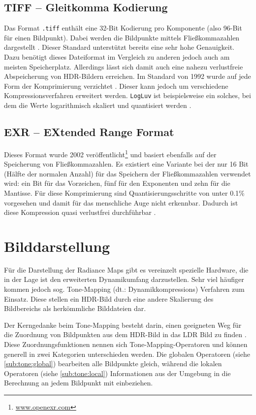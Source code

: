 \subsection{TIFF -- Gleitkomma Kodierung}
\label{sub:tiff}
Das Format \texttt{.tiff} enthält eine 32-Bit Kodierung pro Komponente (also 96-Bit für einen Bildpunkt). Dabei werden die Bildpunkte mittels Fließkommazahlen dargestellt \cite{adobe:tiff}. Dieser Standard unterstützt bereits eine sehr hohe Genauigkeit. Dazu benötigt dieses Dateiformat im Vergleich zu anderen jedoch auch am meisten Speicherplatz. Allerdings lässt sich damit auch eine nahezu verlustfreie Abspeicherung von \gls{HDR}-Bildern erreichen. Im Standard von 1992 wurde auf jede Form der Komprimierung verzichtet \cite[S. 93]{Reinhard}. Dieser kann jedoch um verschiedene Kompressionsverfahren erweitert werden. \texttt{LogLuv} ist beispielsweise ein solches, bei dem die Werte logarithmisch skaliert und quantisiert werden \cite{logluv}. 


\subsection{EXR -- EXtended Range Format}

Dieses Format wurde 2002 veröffentlicht\footnote{\url{www.openexr.com}} und basiert ebenfalls auf der Speicherung von Fließkommazahlen. Es existiert eine Variante bei der nur 16 Bit (Hälfte der normalen Anzahl) für das Speichern der Fließkommazahlen verwendet wird: ein Bit für das Vorzeichen, fünf für den Exponenten und zehn für die Mantisse. Für diese Komprimierung sind Quantisierungsschritte von unter 0.1\% vorgesehen und damit für das menschliche Auge nicht erkennbar. Dadurch ist diese Kompression quasi verlustfrei durchführbar \cite[S. 97f]{Reinhard}.

\section{Bilddarstellung}
\label{subsec:ToneMapping}
 Für die Darstellung der \glspl{Radiance Map} gibt es vereinzelt spezielle Hardware, die in der Lage ist den erweiterten Dynamikumfang darzustellen. Sehr viel häufiger kommen jedoch sog. \gls{Tone-Mapping} (dt.: Dynamikkompressions) Verfahren zum Einsatz. Diese stellen ein HDR-Bild durch eine andere Skalierung des Bildbereichs als herkömmliche Bilddateien dar. 
 
 Der Kerngedanke beim \gls{Tone-Mapping} besteht darin, einen geeigneten Weg für die Zuordnung von Bildpunkten aus dem \gls{HDR}-Bild in das \gls{LDR} Bild zu finden \cite[S. 145]{Bloch2012}. Diese Zuordnungsfunktionen nennen sich \gls{Tone-Mapping}-Operatoren und können generell in zwei Kategorien unterschieden werden. Die globalen Operatoren (siehe \autoref{sub:tone:global}) bearbeiten alle Bildpunkte gleich, während die lokalen Operatoren (siehe \autoref{sub:tone:local}) Informationen aus der Umgebung in die Berechnung an jedem Bildpunkt mit einbeziehen.
 


